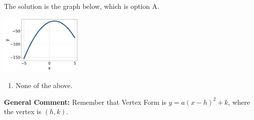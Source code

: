 \documentclass{extbook}[14pt]
\begin{document}
\begin{enumerate}
{The solution is the graph below, which is option A.
\begin{center}
    \includegraphics[width=0.3\textwidth]{../Figures/quadraticEquationToGraphAB.png}
\end{center}\begin{enumerate}[label=\Alph*.]
\item None of the above.\end{enumerate}
\textbf{General Comment:} Remember that Vertex Form is $y = a(x-h)^2+k$, where the vertex is $(h, k)$.
}
\end{enumerate}
\end{document}
